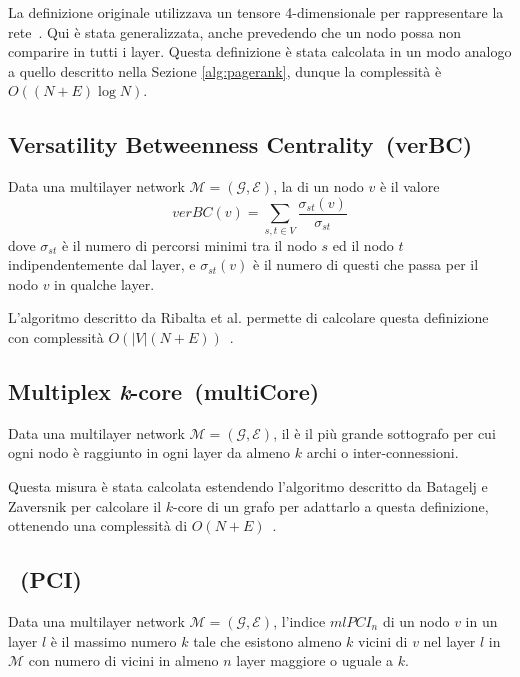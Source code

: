 La definizione originale utilizzava un tensore 4-dimensionale per 
rappresentare la rete~\cite{dedomenico:versatile}. Qui è stata generalizzata, anche prevedendo che un nodo possa non comparire 
in tutti i layer.
Questa definizione è stata calcolata in un modo analogo a quello descritto nella Sezione \ref{alg:pagerank},
dunque la complessità è $O((N + E)\log{N})$.

\subsection{Versatility Betweenness Centrality~(verBC)}

\begin{definizione}[\verBetweennessCentrality]
    Data una multilayer network $\mathcal{M}=(\mathcal{G}, \mathcal{E})$, la 
    \emph{\verBetweennessCentrality} di un nodo $v$ è il valore 
    \begin{equation*}
        \mathit{verBC}(v) = \sum_{s, t \in V} \frac{\sigma_{st}(v)}{\sigma_{st}}
    \end{equation*}
    dove $\sigma_{st}$ è il numero di percorsi minimi tra il nodo $s$ ed il nodo $t$
    indipendentemente dal layer, e $\sigma_{st}(v)$ è il numero di questi che passa 
    per il nodo $v$ in qualche layer.
\end{definizione}

L'algoritmo descritto da Ribalta et al. permette di calcolare questa definizione con complessità
$O\left(|V|\left(N+E\right)\right)$~\cite{dedomenico:verbetw}.

\subsection{Multiplex \emph{k}-core~(multiCore)}

\begin{definizione}[\multiCore]
    Data una multilayer network $\mathcal{M}=(\mathcal{G}, \mathcal{E})$, il \emph{\multiCore} è
    il più grande sottografo per cui ogni nodo è raggiunto in ogni layer da almeno $k$ archi o
    inter-connessioni.
\end{definizione}

Questa misura è stata calcolata estendendo l'algoritmo descritto da Batagelj e Zaversnik per calcolare 
il $k$-core di un grafo per adattarlo a questa definizione, ottenendo una complessità di $O(N + E)$~\cite{batagelj:kcore}.

\subsection{\PCI~(PCI)}
\begin{definizione}
    Data una multilayer network $\mathcal{M}=(\mathcal{G}, \mathcal{E})$, 
    l'indice $\mathit{mlPCI}_n$ di un nodo $v$ in un layer $l$ 
    è il massimo numero $k$ tale che esistono almeno $k$ vicini di $v$ nel layer $l$ in $\mathcal{M}$
    con numero di vicini in almeno $n$ layer maggiore o uguale a $k$.
\end{definizione}

